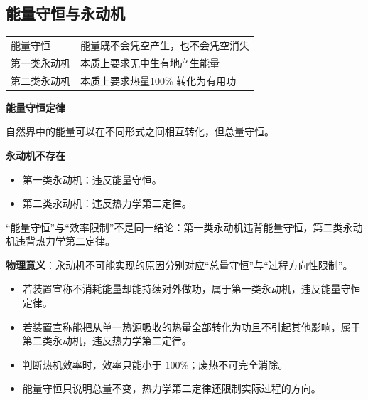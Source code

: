 
\subsection{能量守恒与永动机}
\begin{tabularx}{\columnwidth}{XX}
  能量守恒&能量既不会凭空产生，也不会凭空消失\\
  第一类永动机&本质上要求无中生有地产生能量\\
  第二类永动机&本质上要求热量100\% 转化为有用功\\
\end{tabularx}

\textbf{能量守恒定律}

自然界中的能量可以在不同形式之间相互转化，但总量守恒。

\textbf{永动机不存在}

\begin{itemize}
  \item 第一类永动机：违反能量守恒。
  \item 第二类永动机：违反热力学第二定律。
\end{itemize}

\begin{formulanotebox}
“能量守恒”与“效率限制”不是同一结论：第一类永动机违背能量守恒，第二类永动机违背热力学第二定律。
\end{formulanotebox}

\begin{keypointbox}
\textbf{物理意义}：永动机不可能实现的原因分别对应“总量守恒”与“过程方向性限制”。
\end{keypointbox}

\begin{casetypebox}[title={\strut\textcolor{white}{\bfseries 常见题型：永动机与能量转化方向辨析}}]
\begin{itemize}[leftmargin=1.5em]
  \item 若装置宣称不消耗能量却能持续对外做功，属于第一类永动机，违反能量守恒定律。
  \item 若装置宣称能把从单一热源吸收的热量全部转化为功且不引起其他影响，属于第二类永动机，违反热力学第二定律。
  \item 判断热机效率时，效率只能小于 $100\%$；废热不可完全消除。
  \item 能量守恒只说明总量不变，热力学第二定律还限制实际过程的方向。
\end{itemize}
\end{casetypebox}
